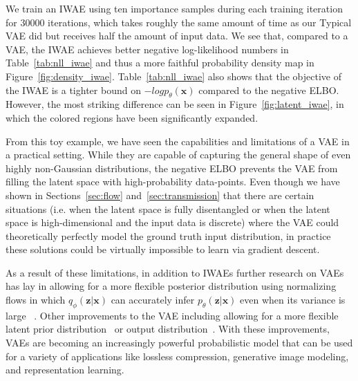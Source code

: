 \documentclass{article}
\begin{document}
We train an IWAE using ten importance samples during each training iteration for 30000 iterations, which takes roughly the same amount of time as our Typical VAE did but receives half the amount of input data.
We see that, compared to a VAE, the IWAE achieves better negative log-likelihood numbers in Table~\ref{tab:nll_iwae} and thus a more faithful probability density map in Figure~\ref{fig:density_iwae}. 
Table~\ref{tab:nll_iwae} also shows that the objective of the IWAE is a tighter bound on $-log p_\theta(\mathbf{x})$ compared to the negative ELBO.
However, the most striking difference can be seen in Figure~\ref{fig:latent_iwae}, in which the colored regions have been significantly expanded.
 
 From this toy example, we have seen the capabilities and limitations of a VAE in a practical setting. While they are capable of capturing the general shape of even highly non-Gaussian distributions, the negative ELBO prevents the VAE from filling the latent space with high-probability data-points. Even though we have shown in Sections~\ref{sec:flow} and~\ref{sec:transmission} that there are certain situations (i.e. when the latent space is fully disentangled or when the latent space is high-dimensional and the input data is discrete) where the VAE could theoretically perfectly model the ground truth input distribution, in practice these solutions could be virtually impossible to learn via gradient descent.
 
 As a result of these limitations, in addition to IWAEs further research on VAEs has lay in allowing for a more flexible posterior distribution using normalizing flows in which $q_\phi(\mathbf{z}|\mathbf{x})$ can accurately infer $p_\theta(\mathbf{z}|\mathbf{x})$ even when its variance is large ~\cite{rezende2015variational,kingma2016improved}. 
 Other improvements to the VAE including allowing for a more flexible latent prior distribution~\cite{tomczak2018vae,bauer2019resampled} or output distribution~\cite{vlae}.
 With these improvements, VAEs are becoming an increasingly powerful probabilistic model that can be used for a variety of applications like lossless compression, generative image modeling, and representation learning.






\end{document}
